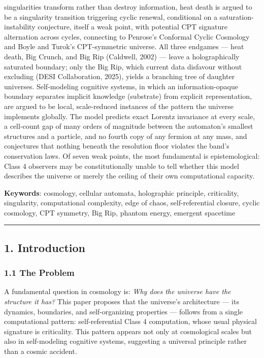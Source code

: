 \documentclass[
]{article}
\begin{document}
singularities transform rather than destroy information, heat death is
argued to be a singularity transition triggering cyclic renewal,
conditional on a saturation-instability conjecture, itself a weak point,
with potential CPT signature alternation across cycles, connecting to
Penrose's Conformal Cyclic Cosmology and Boyle and Turok's CPT-symmetric
universe. All three endgames --- heat death, Big Crunch, and Big Rip
(Caldwell, 2002) --- leave a holographically saturated boundary; only
the Big Rip, which current data disfavour without excluding (DESI
Collaboration, 2025), yields a branching tree of daughter universes.
Self-modeling cognitive systems, in which an information-opaque boundary
separates implicit knowledge (substrate) from explicit representation,
are argued to be local, scale-reduced instances of the pattern the
universe implements globally. The model predicts exact Lorentz
invariance at every scale, a cell-count gap of many orders of magnitude
between the automaton's smallest structures and a particle, and no
fourth copy of any fermion at any mass, and conjectures that nothing
beneath the resolution floor violates the band's conservation laws. Of
seven weak points, the most fundamental is epistemological: Class 4
observers may be constitutionally unable to tell whether this model
describes the universe or merely the ceiling of their own computational
capacity.

\textbf{Keywords}: cosmology, cellular automata, holographic principle,
criticality, singularity, computational complexity, edge of chaos,
self-referential closure, cyclic cosmology, CPT symmetry, Big Rip,
phantom energy, emergent spacetime

\begin{center}\rule{0.5\linewidth}{0.5pt}\end{center}

\hypertarget{introduction}{%
\subsection{1. Introduction}\label{introduction}}

\hypertarget{the-problem}{%
\subsubsection{1.1 The Problem}\label{the-problem}}

A fundamental question in cosmology is: \emph{Why does the universe have
the structure it has?} This paper proposes that the universe's
architecture --- its dynamics, boundaries, and self-organizing
properties --- follows from a single computational pattern:
self-referential Class 4 computation, whose usual physical signature is
criticality. This pattern appears not only at cosmological scales but
also in self-modeling cognitive systems, suggesting a universal
principle rather than a cosmic accident.
\end{document}
